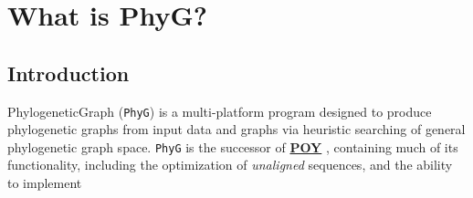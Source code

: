 \documentclass[11pt]{book}
\begin{document}
	\tableofcontents

\chapter{What is PhyG?}

\section{Introduction}
	PhylogeneticGraph (\texttt{PhyG}) is a multi-platform program designed to produce phylogenetic 
	graphs from input data and graphs via heuristic searching of general phylogenetic graph 
	space. \texttt{PhyG} is the successor of \href{https://github.com/wardwheeler/POY5}{\textbf{POY}}
	\citep{POY2,POY3,POY4,Varonetal2010,POY5, Wheeleretal2015}, containing much of its 
	functionality, including the optimization of \textit{unaligned} sequences, and the ability to implement 
\end{document}
